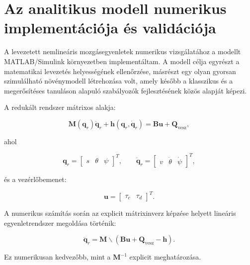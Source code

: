 \documentclass[12pt,a4paper]{report}
\begin{document}
	\section{Az analitikus modell numerikus implementációja és validációja}
	\label{sec:analitikus_validacio}
	
	A levezetett nemlineáris mozgásegyenletek numerikus vizsgálatához a modellt
	MATLAB/Simulink környezetben implementáltam. A modell célja egyrészt a
	matematikai levezetés helyességének ellenőrzése, másrészt egy olyan gyorsan
	szimulálható növénymodell létrehozása volt, amely később a klasszikus és a
	megerősítéses tanuláson alapuló szabályozók fejlesztésének közös alapját képezi.
	
	A redukált rendszer mátrixos alakja:
	
	\begin{equation}
		\mathbf{M}(\mathbf{q}_r)\ddot{\mathbf{q}}_r
		+\mathbf{h}(\mathbf{q}_r,\dot{\mathbf{q}}_r)
		=
		\mathbf{B}\mathbf{u}
		+\mathbf{Q}_{\mathrm{vesz}},
	\end{equation}
	
	ahol
	
	\begin{equation}
		\mathbf{q}_r =
		\begin{bmatrix}
			s & \theta & \psi
		\end{bmatrix}^{T},
		\qquad
		\dot{\mathbf{q}}_r =
		\begin{bmatrix}
			v & \dot{\theta} & \dot{\psi}
		\end{bmatrix}^{T},
	\end{equation}
	
	és a vezérlőbemenet:
	
	\begin{equation}
		\mathbf{u} =
		\begin{bmatrix}
			\tau_c & \tau_d
		\end{bmatrix}^{T}.
	\end{equation}
	
	A numerikus számítás során az explicit mátrixinverz képzése helyett
	lineáris egyenletrendszer megoldása történik:
	
	\begin{equation}
		\ddot{\mathbf{q}}_r
		=
		\mathbf{M}
		\backslash
		\left(
		\mathbf{B}\mathbf{u}
		+\mathbf{Q}_{\mathrm{vesz}}
		-\mathbf{h}
		\right).
	\end{equation}
	
	Ez numerikusan kedvezőbb, mint a
	$\mathbf{M}^{-1}$ explicit meghatározása.
	
\end{document}
